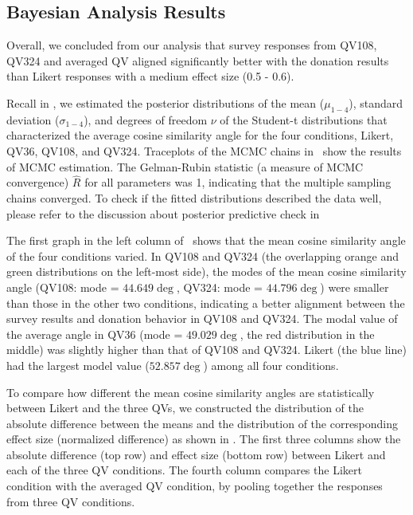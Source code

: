 \subsection{Bayesian Analysis Results}
Overall, we concluded from our analysis that survey responses from QV108, QV324 and averaged QV aligned significantly better with the donation results than Likert responses with a medium effect size (0.5 - 0.6). 

Recall in , we estimated the posterior distributions of the mean ($\mu_{1-4}$), standard deviation ($\sigma_{1-4}$), and degrees of freedom $\nu$ of the Student-t distributions that characterized the average cosine similarity angle for the four conditions, Likert, QV36, QV108, and QV324. Traceplots of the MCMC chains in~ show the results of MCMC estimation. The Gelman-Rubin statistic (a measure of MCMC convergence) $\hat{R}$ for all parameters was 1, indicating that the multiple sampling chains converged. To check if the fitted distributions described the data well, please refer to the discussion about posterior predictive check in 

The first graph in the left column of~ shows that the mean cosine similarity angle of the four conditions varied. In QV108 and QV324 (the overlapping orange and green distributions on the left-most side), the modes of the mean cosine similarity angle (QV108: mode = $44.649 \deg$, QV324: mode = $44.796 \deg$) were smaller than those in the other two conditions, indicating a better alignment between the survey results and donation behavior in QV108 and QV324. The modal value of the average angle in QV36 (mode = $49.029 \deg$, the red distribution in the middle) was slightly higher than that of QV108 and QV324. Likert (the blue line) had the largest model value ($52.857 \deg$) among all four conditions. 

To compare how different the mean cosine similarity angles are statistically between Likert and the three QVs, we constructed the distribution of the absolute difference between the means and the distribution of the corresponding effect size (normalized difference) as shown in . The first three columns show the absolute difference (top row) and effect size (bottom row) between Likert and each of the three QV conditions. The fourth column compares the Likert condition with the averaged QV condition, by pooling together the responses from three QV conditions. 

